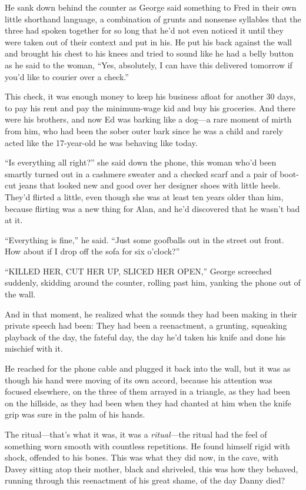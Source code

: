 \documentclass{article}
\begin{document}
He sank down behind the counter as George said something to Fred in
their own little shorthand language, a combination of grunts and
nonsense syllables that the three had spoken together for so long that
he'd not even noticed it until they were taken out of their context
and put in his.  He put his back against the wall and brought his
chest to his knees and tried to sound like he had a belly button as he
said to the woman, ``Yes, absolutely, I can have this delivered
tomorrow if you'd like to courier over a check.''

This check, it was enough money to keep his business afloat for
another 30 days, to pay his rent and pay the minimum-wage kid and buy
his groceries.  And there were his brothers, and now Ed was barking
like a dog---a rare moment of mirth from him, who had been the sober
outer bark since he was a child and rarely acted like the 17-year-old
he was behaving like today.

``Is everything all right?'' she said down the phone, this woman who'd
been smartly turned out in a cashmere sweater and a checked scarf and
a pair of boot-cut jeans that looked new and good over her designer
shoes with little heels.  They'd flirted a little, even though she was
at least ten years older than him, because flirting was a new thing
for Alan, and he'd discovered that he wasn't bad at it.

``Everything is fine,'' he said.  ``Just some goofballs out in the
street out front.  How about if I drop off the sofa for six o'clock?''

``KILLED HER, CUT HER UP, SLICED HER OPEN,'' George screeched
suddenly, skidding around the counter, rolling past him, yanking the
phone out of the wall.

And in that moment, he realized what the sounds they had been making
in their private speech had been:  They had been a reenactment, a
grunting, squeaking playback of the day, the fateful day, the day he'd
taken his knife and done his mischief with it.

He reached for the phone cable and plugged it back into the wall, but
it was as though his hand were moving of its own accord, because his
attention was focused elsewhere, on the three of them arrayed in a
triangle, as they had been on the hillside, as they had been when they
had chanted at him when the knife grip was sure in the palm of his
hands.

The ritual---that's what it was, it was a \textit{ritual}---the ritual
had the feel of something worn smooth with countless repetitions.  He
found himself rigid with shock, offended to his bones.  This was what
they did now, in the cave, with Davey sitting atop their mother, black
and shriveled, this was how they behaved, running through this
reenactment of his great shame, of the day Danny died?
\end{document}
